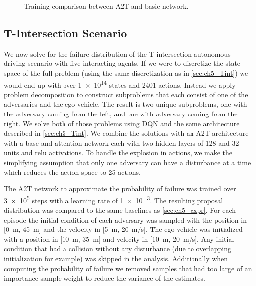 \begin{figure}
        \centering
        
        \caption{Training comparison between A2T and basic network.}
        \label{fig:ch6_adv_gridworld_training}
\end{figure}


\subsection{T-Intersection Scenario}

We now solve for the failure distribution of the T-intersection autonomous driving scenario with five interacting agents. If we were to discretize the state space of the full problem (using the same discretization as in \cref{sec:ch5_Tint}) we would end up with over \num{1e14} states and \num{2401} actions. Instead we apply problem decomposition to construct subproblems that each consist of one of the adversaries and the ego vehicle. The result is two unique subproblems, one with the adversary coming from the left, and one with adversary coming from the right. We solve both of those problems using DQN and the same architecture described in \cref{sec:ch5_Tint}. We combine the solutions with an A2T architecture with a base and attention network each with two hidden layers of \num{128} and \num{32} units and relu activations. To handle the explosion in actions, we make the simplifying assumption that only one adversary can have a disturbance at a time which reduces the action space to \num{25} actions.  

The A2T network to approximate the probability of failure was trained over \num{3e5} steps with a learning rate of \num{1e-3}. The resulting proposal distribution was compared to the same baselines as \cref{sec:ch5_expr}. For each episode the initial condition of each adversary was sampled with the position in [\SI{0}{m}, \SI{45}{m}] and the velocity in  [\SI{5}{m}, \SI{20}{m/s}]. The ego vehicle was initialized with a position in [\SI{10}{m}, \SI{35}{m}] and velocity in [\SI{10}{m}, \SI{20}{m/s}]. Any initial condition that had a collision without any disturbance (due to overlapping initialization for example) was skipped in the analysis. Additionally when computing the probability of failure we removed samples that had too large of an importance sample weight to reduce the variance of the estimates. 

